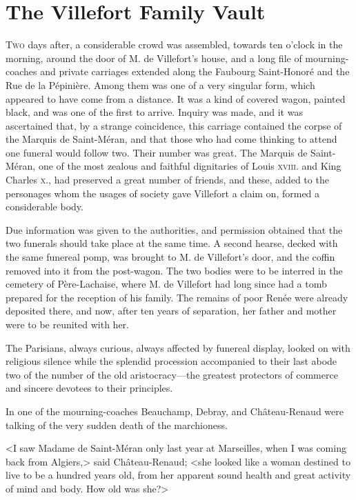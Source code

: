 \chapter{The Villefort Family Vault} 

 \lettrine{T}{wo} days after, a considerable crowd was assembled, towards ten o'clock in the morning, around the door of M. de Villefort's house, and a long file of mourning-coaches and private carriages extended along the Faubourg Saint-Honoré and the Rue de la Pépinière. Among them was one of a very singular form, which appeared to have come from a distance. It was a kind of covered wagon, painted black, and was one of the first to arrive. Inquiry was made, and it was ascertained that, by a strange coincidence, this carriage contained the corpse of the Marquis de Saint-Méran, and that those who had come thinking to attend one funeral would follow two. Their number was great. The Marquis de Saint-Méran, one of the most zealous and faithful dignitaries of Louis \textsc{xviii.} and King Charles \textsc{x.}, had preserved a great number of friends, and these, added to the personages whom the usages of society gave Villefort a claim on, formed a considerable body. 

 Due information was given to the authorities, and permission obtained that the two funerals should take place at the same time. A second hearse, decked with the same funereal pomp, was brought to M. de Villefort's door, and the coffin removed into it from the post-wagon. The two bodies were to be interred in the cemetery of Père-Lachaise, where M. de Villefort had long since had a tomb prepared for the reception of his family. The remains of poor Renée were already deposited there, and now, after ten years of separation, her father and mother were to be reunited with her. 

 The Parisians, always curious, always affected by funereal display, looked on with religious silence while the splendid procession accompanied to their last abode two of the number of the old aristocracy—the greatest protectors of commerce and sincere devotees to their principles. 

 In one of the mourning-coaches Beauchamp, Debray, and Château-Renaud were talking of the very sudden death of the marchioness. 

 <I saw Madame de Saint-Méran only last year at Marseilles, when I was coming back from Algiers,> said Château-Renaud; <she looked like a woman destined to live to be a hundred years old, from her apparent sound health and great activity of mind and body. How old was she?> 

